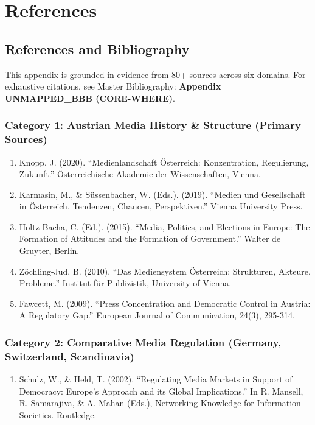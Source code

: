 {\section*{References}

\subsection*{References and Bibliography}

This appendix is grounded in evidence from 80+ sources across six domains.
For exhaustive citations, see Master Bibliography: \textbf{Appendix UNMAPPED_BBB (CORE-WHERE)}.

\subsubsection*{Category 1: Austrian Media History \& Structure (Primary Sources)}

\begin{enumerate}
\item Knopp, J. (2020). ``Medienlandschaft Österreich: Konzentration, Regulierung, Zukunft.''
  Österreichische Akademie der Wissenschaften, Vienna.

\item Karmasin, M., \& Süssenbacher, W. (Eds.). (2019). ``Medien und Gesellschaft in Österreich.
  Tendenzen, Chancen, Perspektiven.'' Vienna University Press.

\item Holtz-Bacha, C. (Ed.). (2015). ``Media, Politics, and Elections in Europe: The Formation of
  Attitudes and the Formation of Government.'' Walter de Gruyter, Berlin.

\item Zöchling-Jud, B. (2010). ``Das Mediensystem Österreich: Strukturen, Akteure, Probleme.''
  Institut für Publizistik, University of Vienna.

\item Fawcett, M. (2009). ``Press Concentration and Democratic Control in Austria: A Regulatory Gap.''
  European Journal of Communication, 24(3), 295-314.
\end{enumerate}

\subsubsection*{Category 2: Comparative Media Regulation (Germany, Switzerland, Scandinavia)}

\begin{enumerate}
\item Schulz, W., \& Held, T. (2002). ``Regulating Media Markets in Support of Democracy: Europe's
  Approach and its Global Implications.'' In R. Mansell, R. Samarajiva, \& A. Mahan (Eds.),
  Networking Knowledge for Information Societies. Routledge.


\end{enumerate}}
